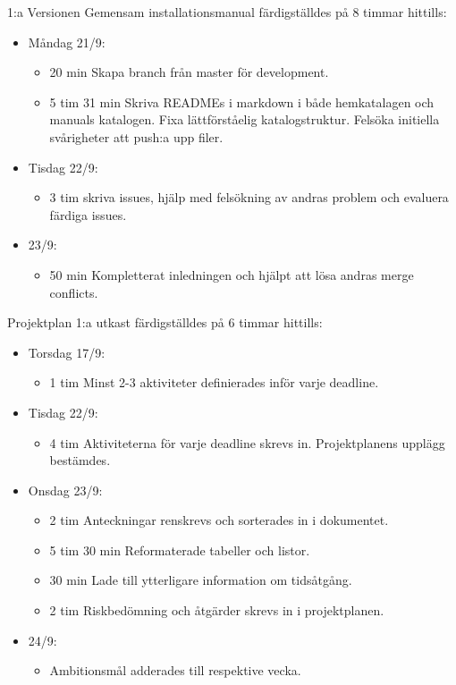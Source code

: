 \documentclass{TDP003mall}
\begin{document}
1:a Versionen Gemensam installationsmanual färdigställdes på 8 timmar hittills:
\begin{itemize}
	\item Måndag 21/9:
	\begin{itemize}
		\item 20 min Skapa branch från master för development.
		\item 5 tim 31 min Skriva READMEs i markdown i både hemkatalagen och manuals katalogen. Fixa lättförståelig katalogstruktur. Felsöka initiella svårigheter att push:a upp filer.
	\end{itemize}
	\item Tisdag 22/9:
	\begin{itemize}
                \item 3 tim skriva issues, hjälp med felsökning av andras problem och evaluera färdiga issues.
        \end{itemize}
        \item 23/9:
        \begin{itemize}
                \item 50 min Kompletterat inledningen och hjälpt att lösa andras merge conflicts.\\
	\end{itemize}
\end{itemize}

	Projektplan 1:a utkast färdigställdes på 6 timmar hittills:
\begin{itemize}
	\item Torsdag 17/9:
	\begin{itemize}
		\item 1 tim Minst 2-3 aktiviteter definierades inför varje deadline.
	\end{itemize}
	\item Tisdag 22/9:
	\begin{itemize}
		\item 4 tim Aktiviteterna för varje deadline skrevs in. Projektplanens upplägg bestämdes.
	\end{itemize}
	\item Onsdag 23/9:
	\begin{itemize}
		\item 2 tim Anteckningar renskrevs och sorterades in i dokumentet.
		\item 5 tim 30 min Reformaterade tabeller och listor.
		\item 30 min Lade till ytterligare information om tidsåtgång.
                \item 2 tim Riskbedömning och åtgärder skrevs in i projektplanen.
	\end{itemize}
        \item 24/9:
        \begin{itemize}
          \item Ambitionsmål adderades till respektive vecka.
	\end{itemize}
      \end{itemize}
\end{document}
